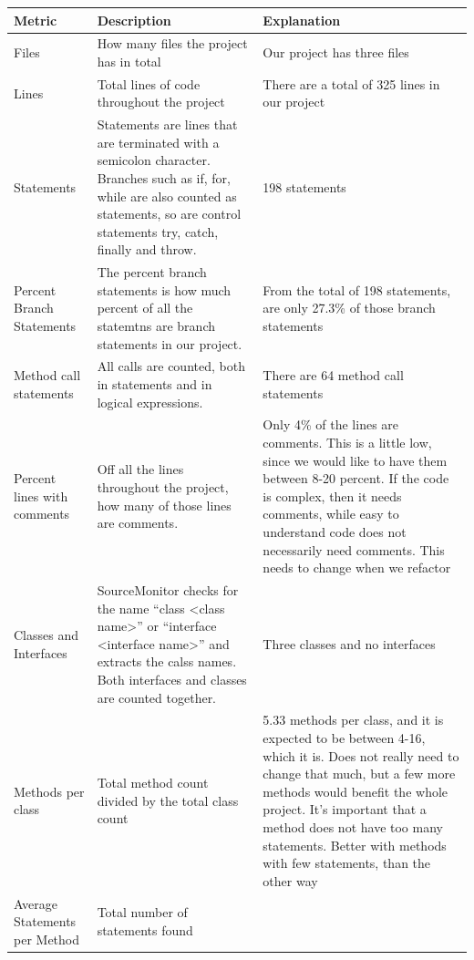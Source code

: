 \documentclass[UKenglish]{article}  %
\begin{document}
\begin{longtable}[H]{| m{1in} |  m{2in} | m{2in} |}
       \hline
       \textbf{Metric} & \textbf{Description} & \textbf{Explanation}\\
       \hline Files & How many files the project has in total & Our project has
        three files\\
       \hline Lines & Total lines of code throughout the project & There are a
       total of 325 lines in our project\\
       \hline Statements & Statements are lines that are terminated with a
       semicolon character. Branches such as if, for, while are also counted as
       statements, so are control statements try, catch, finally and throw. &
       198 statements\\
       \hline Percent Branch Statements & The percent branch statements is how
       much percent of all the statemtns are branch statements in our project. &
       From the total of 198 statements, are only 27.3\% of those branch
       statements\\
       \hline Method call statements & All calls are counted, both in statements
       and in logical expressions. & There are 64 method call statements\\
       \hline Percent lines with comments & Off all the lines throughout the
       project, how many of those lines are comments. &  Only 4\% of the lines
       are comments. This is a little low, since we would like to have them
       between 8-20 percent. If the code is complex, then it needs comments,
       while easy to understand code does not necessarily need comments. This
       needs to change when we refactor \\
       \hline Classes and Interfaces & SourceMonitor checks for the name ``class
       <class name>'' or ``interface <interface name>'' and extracts the calss
       names. Both interfaces and classes are counted together. & Three classes
       and no interfaces \\
       \hline Methods per class & Total method count divided by the total class
       count & 5.33 methods per class, and it is expected to be between 4-16,
       which it is. Does not really need to change that much, but a few more
       methods would benefit the whole project. It's important that a method
       does not have too many statements. Better with methods with few
       statements, than the other way\\
       \hline Average Statements per Method & Total number of statements found

\end{longtable}
\end{document}

